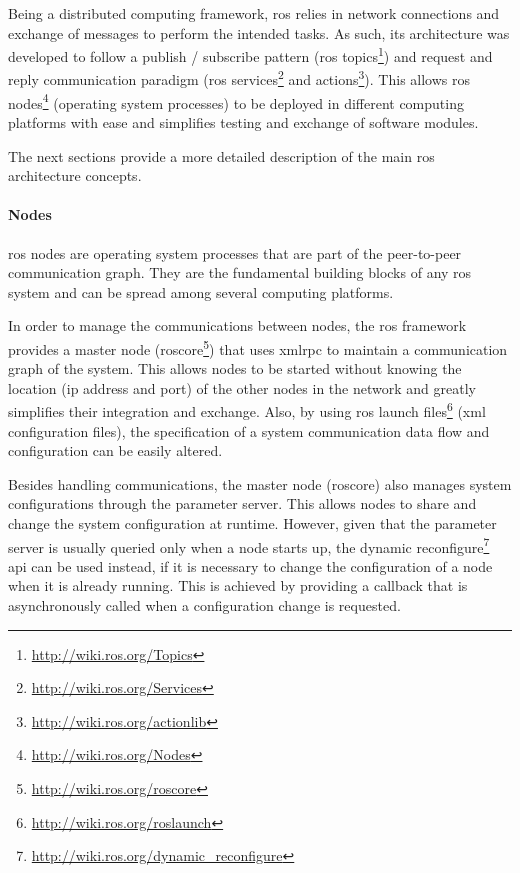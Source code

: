 Being a distributed computing framework, \gls{ros} relies in network connections and exchange of messages to perform the intended tasks. As such, its architecture was developed to follow a publish / subscribe pattern (\gls{ros} topics\footnote{\url{http://wiki.ros.org/Topics}}) and request and reply communication paradigm (\gls{ros} services\footnote{\url{http://wiki.ros.org/Services}} and actions\footnote{\url{http://wiki.ros.org/actionlib}}). This allows \gls{ros} nodes\footnote{\url{http://wiki.ros.org/Nodes}} (operating system processes) to be deployed in different computing platforms with ease and simplifies testing and exchange of software modules.

The next sections provide a more detailed description of the main \gls{ros} architecture concepts.


\paragraph{Nodes}

\gls{ros} nodes are operating system processes that are part of the peer-to-peer communication graph. They are the fundamental building blocks of any \gls{ros} system and can be spread among several computing platforms.

In order to manage the communications between nodes, the \gls{ros} framework provides a master node (roscore\footnote{\url{http://wiki.ros.org/roscore}}) that uses \gls{xmlrpc} to maintain a communication graph of the system. This allows nodes to be started without knowing the location (\gls{ip} address and port) of the other nodes in the network and greatly simplifies their integration and exchange. Also, by using \gls{ros} launch files\footnote{\url{http://wiki.ros.org/roslaunch}} (\gls{xml} configuration files), the specification of a system communication data flow and configuration can be easily altered.

Besides handling communications, the master node (roscore) also manages system configurations through the parameter server. This allows nodes to share and change the system configuration at runtime. However, given that the parameter server is usually queried only when a node starts up, the dynamic reconfigure\footnote{\url{http://wiki.ros.org/dynamic_reconfigure}} \gls{api} can be used instead, if it is necessary to change the configuration of a node when it is already running. This is achieved by providing a callback that is asynchronously called when a configuration change is requested.

